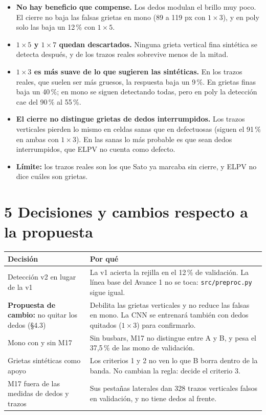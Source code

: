 \documentclass[10pt,a4paper]{article}
\begin{document}
\begin{itemize}[leftmargin=14pt]
  \item \textbf{No hay beneficio que compense.} Los dedos modulan el brillo muy poco. El cierre no baja las falsas grietas en mono (89 a 119 px con $1\times3$), y en poly solo
        las baja un 12\,\% con $1\times5$.
  \item \textbf{$1\times5$ y $1\times7$ quedan descartados.} Ninguna grieta vertical fina sintética se detecta después, y de los trazos reales sobrevive menos de la mitad.
  \item \textbf{$1\times3$ es más suave de lo que sugieren las sintéticas.} En los trazos reales, que suelen ser más gruesos, la respuesta baja un 9\,\%. En grietas finas baja un 40\,\%;
        en mono se siguen detectando todas, pero en poly la detección cae del 90\,\% al 55\,\%.
  \item \textbf{El cierre no distingue grietas de dedos interrumpidos.} Los trazos verticales pierden lo mismo en celdas sanas que en defectuosas (siguen el 91\,\% en ambas con
        $1\times3$). En las sanas lo más probable es que sean dedos interrumpidos, que ELPV no cuenta como defecto.
  \item \textbf{Límite:} los trazos reales son los que Sato ya marcaba sin cierre, y ELPV no dice cuáles son grietas.
\end{itemize}

\section*{5 \quad Decisiones y cambios respecto a la propuesta}

\begin{table}[H]
\centering\small
\begin{tabularx}{\textwidth}{@{}>{\raggedright}p{4.4cm} X@{}}
\toprule
Decisión & Por qué \\
\midrule
Detección v2 en lugar de la v1 & La v1 acierta la rejilla en el 12\,\% de validación. La línea base del Avance 1 no se toca: \texttt{src/preproc.py} sigue igual. \\
\textbf{Propuesta de cambio:} no quitar los dedos (§4.3) & Debilita las grietas verticales y no reduce las falsas en mono. La CNN se entrenará también con dedos quitados ($1\times3$) para confirmarlo. \\
Mono con y sin M17 & Sin busbars, M17 no distingue entre A y B, y pesa el 37,5\,\% de las mono de validación. \\
Grietas sintéticas como apoyo & Los criterios 1 y 2 no ven lo que B borra dentro de la banda. No cambian la regla: decide el criterio 3. \\
M17 fuera de las medidas de dedos y trazos & Sus pestañas laterales dan 328 trazos verticales falsos en validación, y no tiene dedos al frente. \\
\bottomrule
\end{tabularx}
\end{table}
\end{document}
